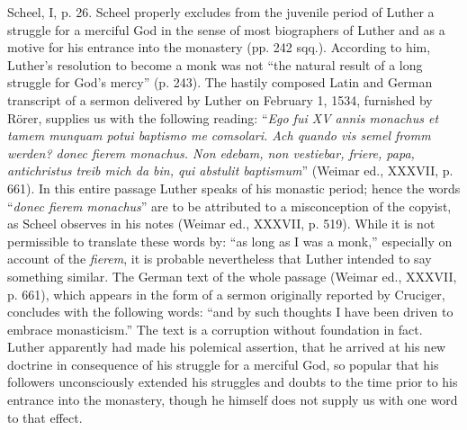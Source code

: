 {Scheel, I, p. 26. Scheel properly excludes from the juvenile period of Luther a struggle
for a merciful God in the sense of most biographers of Luther and as a motive for his
entrance into the monastery (pp. 242 sqq.). According to him, Luther’s resolution to become
a monk was not “the natural result of a long struggle for God’s mercy” (p. 243).
The hastily composed Latin and German transcript of a sermon delivered by Luther on
February 1, 1534, furnished by Rörer, supplies us with the following reading: “\textit{Ego fui XV
annis monachus et tamem munquam potui baptismo me comsolari. Ach quando vis semel
fromm werden? donec fierem monachus. Non edebam, non vestiebar, friere, papa, antichristus
treib mich da bin, qui abstulit baptismum}” (Weimar ed., XXXVII, p. 661). In this entire
passage Luther speaks of his monastic period; hence the words “\textit{donec fierem monachus}”
are to be attributed to a misconception of the copyist, as Scheel observes in his notes
(Weimar ed., XXXVII, p. 519). While it is not permissible to translate these words by: “as
long as I was a monk,” especially on account of the \textit{fierem}, it is probable nevertheless that
Luther intended to say something similar. The German text of the whole passage (Weimar
ed., XXXVII, p. 661), which appears in the form of a sermon originally reported by
Cruciger, concludes with the following words: “and by such thoughts I have been driven
to embrace monasticism.” The text is a corruption without foundation in fact. Luther apparently
had made his polemical assertion, that he arrived at his new doctrine in consequence
of his struggle for a merciful God, so popular that his followers unconsciously extended
his struggles and doubts to the time prior to his entrance into the monastery, though
he himself does not supply us with one word to that effect.}

